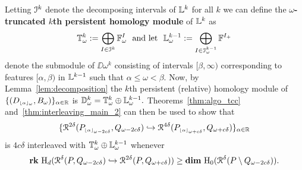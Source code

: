 Letting $\mathcal{I}^k$ denote the decomposing intervals of $\mathbb{L}^k$ for all $k$ we can define the \textbf{$\omega$-truncated $k$th persistent homology module} of $\mathbb{L}^k$ as
\[ \T_\omega^k := \bigoplus_{I\in\I^k} \FF_\omega^I\ \text{ and let }\ \LL_\omega^{k-1} := \bigoplus_{I\in \I_\omega^{k-1}} \FF^{I_+}\]
denote the submodule of $\DD{\omega}^k$ consisting of intervals $[\beta,\infty)$ corresponding to features $[\alpha,\beta)$ in $\mathbb{L}^{k-1}$ such that $\alpha\leq\omega <\beta$.
Now, by Lemma~\ref{lem:decomposition} the $k$th persistent (relative) homology module of $\{(D_{\scriptscriptstyle \lfloor\alpha\rfloor_{\omega}}, B_\omega)\}_{\alpha\in\mathbb{R}}$ is $\mathbb{D}_{\omega}^k = \mathbb{T}_\omega^k\oplus \mathbb{L}_\omega^{k-1}.$
Theorems~\ref{thm:algo_tcc} and~\ref{thm:interleaving_main_2} can then be used to show that
\[ \{\mathcal{R}^{2\delta}(P_{\scriptscriptstyle \lfloor\alpha\rfloor_{\omega-2c\delta}}, Q_{\omega-2c\delta})\hookrightarrow \mathcal{R}^{4\delta}(P_{\scriptscriptstyle \lfloor\alpha\rfloor_{\omega+c\delta}}, Q_{\omega+c\delta})\}_{\alpha\in\mathbb{R}} \]
is $4c\delta$ interleaved with $\mathbb{T}_\omega^k\oplus \mathbb{L}_\omega^{k-1}$ whenever
\[ \mathbf{rk}~\mathrm{H}_d(\mathcal{R}^\delta(P, Q_{\omega - 2c\delta})\hookrightarrow \mathcal{R}^{2\delta}(P, Q_{\omega+c\delta})) \geq \mathbf{dim}~\mathrm{H}_0(\mathcal{R}^\delta(P\setminus Q_{\omega-2c\delta})).\]


%

